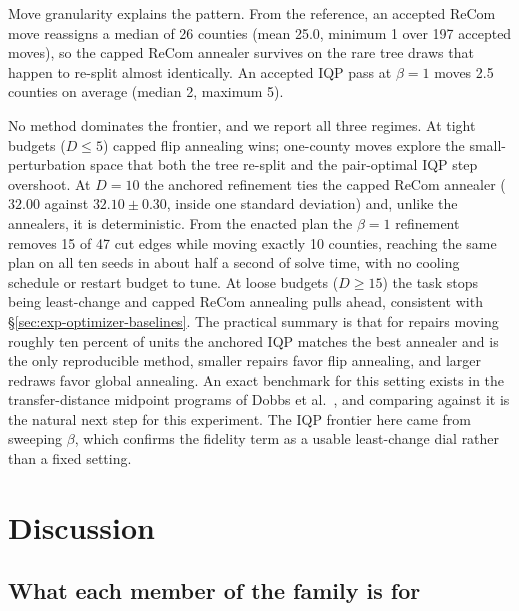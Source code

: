 \documentclass[11pt]{article}
\begin{document}
Move granularity explains the pattern. From the reference, an
accepted ReCom move reassigns a median of 26 counties (mean 25.0,
minimum 1 over 197 accepted moves), so the capped ReCom annealer
survives on the rare tree draws that happen to re-split almost
identically. An accepted IQP pass at $\beta = 1$ moves 2.5 counties
on average (median 2, maximum 5).

No method dominates the frontier, and we report all three regimes.
At tight budgets ($D \le 5$) capped flip annealing wins; one-county
moves explore the small-perturbation space that both the tree
re-split and the pair-optimal IQP step overshoot. At $D = 10$ the
anchored refinement ties the capped ReCom annealer ($32.00$ against
$32.10 \pm 0.30$, inside one standard deviation) and, unlike the
annealers, it is deterministic. From the enacted plan the $\beta = 1$ refinement
removes 15 of 47 cut edges while moving exactly 10 counties, reaching
the same plan on all ten seeds in about half a second of solve time,
with no cooling schedule or restart budget to tune. At loose budgets
($D \ge 15$) the task stops being least-change and capped ReCom
annealing pulls ahead, consistent with
\S\ref{sec:exp-optimizer-baselines}. The practical summary is that
for repairs moving roughly ten percent of units the anchored IQP
matches the best annealer and is the only reproducible method,
smaller repairs favor flip annealing, and larger redraws favor global
annealing. An exact benchmark for this setting exists in the
transfer-distance midpoint programs of Dobbs et
al.~\cite{dobbs2024facilitating}, and comparing against it is the
natural next step for this experiment. The IQP
frontier here came from sweeping $\beta$, which confirms the fidelity
term as a usable least-change dial rather than a fixed setting.

\section{Discussion}\label{sec:discussion}

\subsection{What each member of the family is for}\label{sec:disc-roles}
\end{document}
